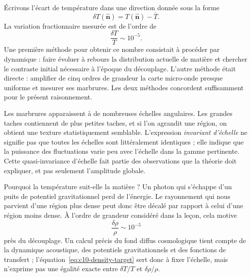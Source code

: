 Écrivons l’écart de température dans une direction donnée sous la forme
\[
\delta T(\hat{\mathbf n})=T(\hat{\mathbf n})-\bar T.
\]
La variation fractionnaire mesurée est de l’ordre de
\begin{equation}
\frac{\delta T}{T}\sim10^{-5}.
\label{eq:c10-cmb-anisotropy}
\end{equation}
Une première méthode pour obtenir ce nombre consistait à procéder par dynamique : faire évoluer à rebours la distribution actuelle de matière et chercher le contraste initial nécessaire à l’époque du découplage. L’autre méthode était directe : amplifier de cinq ordres de grandeur la carte micro-onde presque uniforme et mesurer ses marbrures. Les deux méthodes concordent suffisamment pour le présent raisonnement.

Les marbrures apparaissent à de nombreuses échelles angulaires. Les grandes taches contiennent de plus petites taches, et si l’on agrandit une région, on obtient une texture statistiquement semblable. L’expression \emph{invariant d’échelle} ne signifie pas que toutes les échelles sont littéralement identiques ; elle indique que la puissance des fluctuations varie peu avec l’échelle dans la gamme pertinente. Cette quasi-invariance d’échelle fait partie des observations que la théorie doit expliquer, et pas seulement l’amplitude globale.

Pourquoi la température suit-elle la matière ? Un photon qui s’échappe d’un puits de potentiel gravitationnel perd de l’énergie. Le rayonnement qui nous parvient d’une région plus dense peut donc être décalé par rapport à celui d’une région moins dense. À l’ordre de grandeur considéré dans la leçon, cela motive
\begin{equation}
\frac{\delta\rho}{\rho}\sim10^{-5}
\label{eq:c10-density-target}
\end{equation}
près du découplage. Un calcul précis du fond diffus cosmologique tient compte de la dynamique acoustique, des potentiels gravitationnels et des fonctions de transfert ; l’équation~\eqref{eq:c10-density-target} sert donc à fixer l’échelle, mais n’exprime pas une égalité exacte entre \(\delta T/T\) et \(\delta\rho/\rho\).

\begin{classroomqa}
\end{classroomqa}

